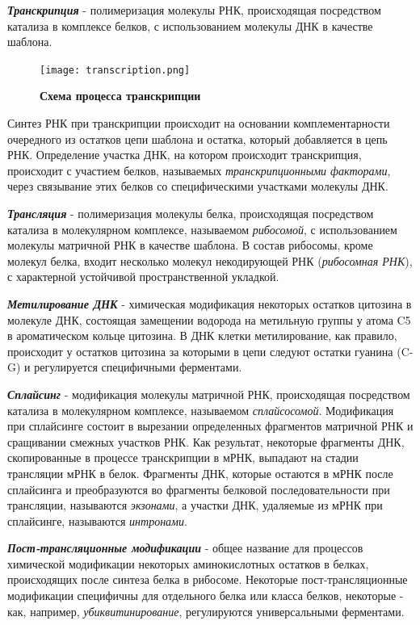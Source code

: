 \noindent
\textbf{ \textit{Транскрипция} } - полимеризация молекулы РНК, происходящая посредством катализа в комплексе белков, с использованием молекулы ДНК в качестве шаблона.


\begin{figure}[H]
  \centering
  \vskip 12pt 
  \texttt{[image: transcription.png]}
  \vskip 12pt
  \caption[m1]{
  \textbf{Схема процесса транскрипции}\itshape
} 
 \label{img:transcription}
\end{figure}

Синтез РНК при транскрипции происходит на основании комплементарности очередного из остатков цепи шаблона и остатка, который добавляется в цепь РНК. Определение участка ДНК, на котором происходит транскрипция, происходит с участием белков, называемых \textit{транскрипционными факторами}, через связывание этих белков со специфическими участками молекулы ДНК. 


\noindent
\textbf{ \textit{Трансляция} } - полимеризация молекулы белка, происходящая посредством катализа в молекулярном комплексе, называемом \textit{рибосомой}, с использованием молекулы матричной РНК в качестве шаблона. В состав рибосомы, кроме молекул белка, входит несколько молекул некодирующей РНК (\textit{рибосомная РНК}), с характерной устойчивой пространственной укладкой.

\noindent
\textbf{ \textit{Метилирование ДНК} } - химическая модификация некоторых остатков цитозина в молекуле ДНК, состоящая замещении  водорода на метильную группы у атома C5 в ароматическом кольце цитозина. В ДНК клетки метилирование, как правило, происходит у остатков цитозина за которыми в цепи следуют остатки гуанина (C-G) и регулируется специфичными ферментами.

\noindent
\textbf{ \textit{Сплайсинг} } - модификация молекулы матричной РНК, происходящая посредством катализа в молекулярном комплексе, называемом \textit{сплайсосомой}. Модификация при сплайсинге состоит в вырезании определенных фрагментов матричной РНК и сращивании смежных участков РНК. Как результат, некоторые фрагменты ДНК, скопированные в процессе транскрипции в мРНК, выпадают на стадии трансляции мРНК в белок. Фрагменты ДНК, которые остаются в мРНК после сплайсинга и преобразуются во фрагменты белковой последовательности при трансляции, называются \textit{экзонами}, а участки ДНК, удаляемые из мРНК при сплайсинге, называются  \textit{интронами}.

\noindent
\textbf{ \textit{Пост-трансляционные модификации} } - общее название для процессов химической модификации некоторых аминокислотных остатков в белках, происходящих после синтеза белка в рибосоме. Некоторые пост-трансляционные модификации специфичны для отдельного белка или класса белков, некоторые - как, например, \textit{убиквитинирование}, регулируются универсальными ферментами. 

